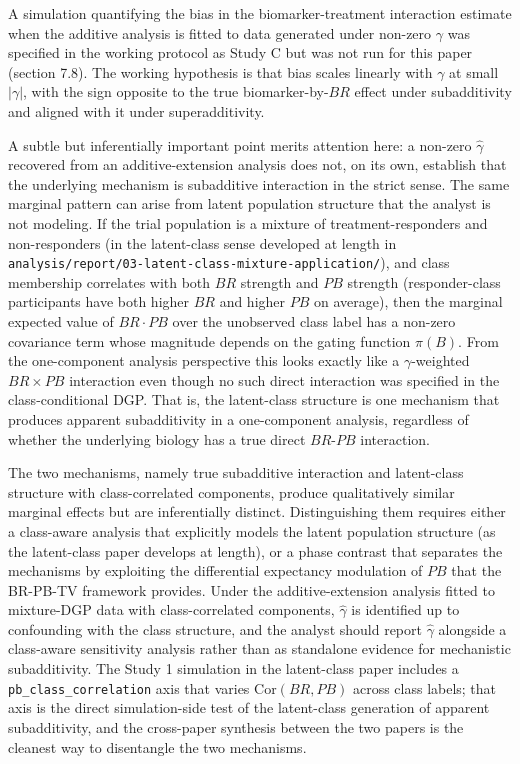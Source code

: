 \documentclass[
  11pt,
]{article}
\begin{document}
A simulation quantifying the bias in the biomarker-treatment interaction
estimate when the additive analysis is fitted to data generated under
non-zero \(\gamma\) was specified in the working protocol as Study C but
was not run for this paper (section 7.8). The working hypothesis is that
bias scales linearly with \(\gamma\) at small \(|\gamma|\), with the sign
opposite to the true biomarker-by-\(BR\) effect under subadditivity and
aligned with it under superadditivity.

A subtle but inferentially important point merits attention here: a non-zero
\(\hat{\gamma}\) recovered from an additive-extension analysis does not, on its
own, establish that the underlying mechanism is subadditive interaction in the
strict sense. The same marginal pattern can arise from latent population
structure that the analyst is not modeling. If the trial population is a
mixture of treatment-responders and non-responders (in the latent-class sense
developed at length in
\texttt{analysis/report/03-latent-class-mixture-application/}), and class
membership correlates with both \(BR\) strength and \(PB\) strength
(responder-class participants have both higher \(BR\) and higher \(PB\) on
average), then the marginal expected value of \(BR \cdot PB\) over the
unobserved class label has a non-zero covariance term whose magnitude depends
on the gating function \(\pi(B)\). From the one-component analysis perspective
this looks exactly like a \(\gamma\)-weighted \(BR \times PB\) interaction even
though no such direct interaction was specified in the class-conditional DGP.
That is, the latent-class structure is one mechanism that produces apparent
subadditivity in a one-component analysis, regardless of whether the
underlying biology has a true direct \(BR\)-\(PB\) interaction.

The two mechanisms, namely true subadditive interaction and latent-class
structure with class-correlated components, produce qualitatively similar
marginal effects but are inferentially distinct. Distinguishing them requires
either a class-aware analysis that explicitly models the latent population
structure (as the latent-class paper develops at length), or a phase contrast
that separates the mechanisms by exploiting the differential expectancy
modulation of \(PB\) that the BR-PB-TV framework provides. Under the
additive-extension analysis fitted to mixture-DGP data with class-correlated
components, \(\hat{\gamma}\) is identified up to confounding with the class
structure, and the analyst should report \(\hat{\gamma}\) alongside a
class-aware sensitivity analysis rather than as standalone evidence for
mechanistic subadditivity. The Study 1 simulation in the latent-class paper
includes a \texttt{pb\_class\_correlation} axis that varies \(\mathrm{Cor}(BR,
PB)\) across class labels; that axis is the direct simulation-side test of the
latent-class generation of apparent subadditivity, and the cross-paper
synthesis between the two papers is the cleanest way to disentangle the two
mechanisms.
\end{document}
